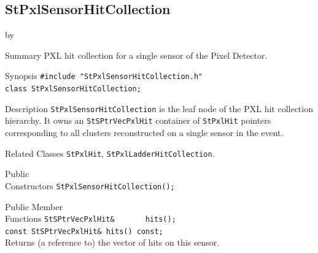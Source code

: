 \documentclass[twoside]{article}
\newcommand{\entrylabel}[1]{\mbox{\textbf{{#1}}}\hfil}%
\newenvironment{entry}
{\begin{list}{}%
    {\renewcommand{\makelabel}{\entrylabel}%
     \setlength{\labelwidth}{90pt}%
     \setlength{\leftmargin}{\labelwidth}
     \advance\leftmargin by \labelsep%
      }%
    }%
  {\end{list}}
\newcommand{\Entrylabel}[1]%
{\raisebox{0pt}[1ex][0pt]{\makebox[\labelwidth][l]%
    {\parbox[t]{\labelwidth}{\hspace{0pt}\textbf{{#1}}}}}}
\newenvironment{Entry}%
{\renewcommand{\entrylabel}{\Entrylabel}\begin{entry}}%
  {\end{entry}}
\begin{document}
\subsection{StPxlSensorHitCollection}
\label{sec:StPxlSensorHitCollection}
\begin{Entry}
\item[Summary] PXL hit collection for a single sensor of the Pixel Detector.
\item[Synopsis]
    \verb+#include "StPxlSensorHitCollection.h"+\\
    \verb+class StPxlSensorHitCollection;+\\
\item[Description]
    \texttt{StPxlSensorHitCollection} is the leaf node of the PXL hit
    collection hierarchy.  It owns an \texttt{StSPtrVecPxlHit} container of
    \texttt{StPxlHit} pointers corresponding to all clusters reconstructed on
    a single sensor in the event.
\item[Related Classes]
    \texttt{StPxlHit}, \texttt{StPxlLadderHitCollection}.
\item[Public\\ Constructors]
    \verb+StPxlSensorHitCollection();+\\
\item[Public Member\\ Functions]
    \verb+StSPtrVecPxlHit&       hits();+\\
    \verb+const StSPtrVecPxlHit& hits() const;+\\
    Returns (a reference to) the vector of hits on this sensor.\\
\end{Entry}
\clearpage

\end{document}
